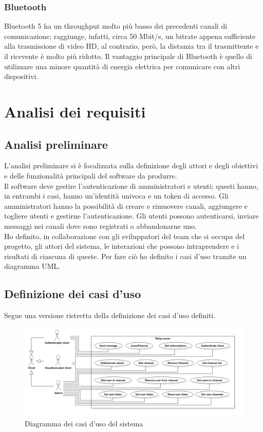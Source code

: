 		\subsubsection{Bluetooth}
			Bluetooth 5 ha un throughput molto più basso dei precedenti canali di comunicazione; raggiunge, infatti, circa 50 Mbit/s, un bitrate appena sufficiente alla trasmissione di video HD, al contrario, però, la distanza tra il trasmittente e il ricevente è molto più ridotto. Il vantaggio principale di Bluetooth è quello di utilizzare una minore quantità di energia elettrica per comunicare con altri dispositivi.

\section{Analisi dei requisiti}
	\subsection{Analisi preliminare}
		L'analisi preliminare si è focalizzata sulla definizione degli attori e degli obiettivi e delle funzionalità principali del software da produrre.
		\\
		Il software deve gestire l'autenticazione di amministratori e utenti; questi hanno, in entrambi i casi, hanno un'identità univoca e un token di accesso. Gli amministratori hanno la possibilità di creare e rimuovere canali, aggiungere e togliere utenti e gestirne l'autenticazione.
		Gli utenti possono autenticarsi, inviare messaggi nei canali dove sono registrati o abbandonarne uno.
		\\
		Ho definito, in collaborazione con gli sviluppatori del team che si occupa del progetto, gli attori del sistema, le interazioni che possono intraprendere e i risultati di ciascuna di queste. Per fare ciò ho definito i casi d'uso tramite un diagramma UML.\@

	\subsection{Definizione dei casi d'uso}
		Segue una versione ristretta della definizione dei casi d'uso definiti.
		\begin{figure}[H]
			\begin{center}
			\includegraphics[width=16.5cm,keepaspectratio]{UML/png/Use Case Model__Use Cases_0}
			\caption{Diagramma dei casi d'uso del sistema}
			\end{center}
		\end{figure}

